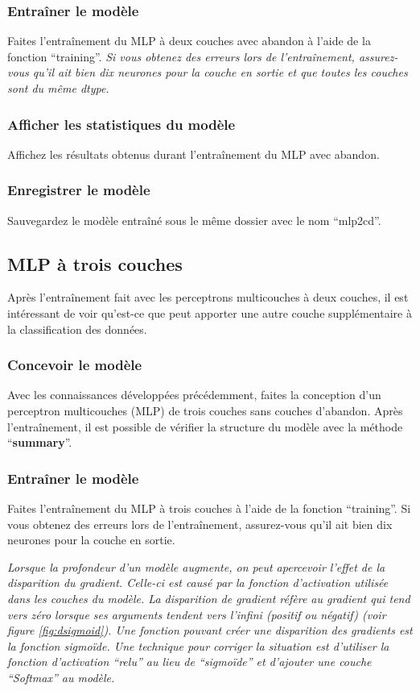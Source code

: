 \documentclass{article}
\begin{document}
\subsubsection{Entraîner le modèle}
Faites l'entraînement du MLP à deux couches avec abandon à l'aide de la fonction ``training''.
\medbreak
\textit{Si vous obtenez des erreurs lors de l'entraînement, assurez-vous qu'il ait bien dix neurones pour la couche en sortie et que toutes les couches sont du même dtype.}
\subsubsection{Afficher les statistiques du modèle}
Affichez les résultats obtenus durant l'entraînement du MLP avec abandon.
\subsubsection{Enregistrer le modèle}
Sauvegardez le modèle entraîné sous le même dossier avec le nom ``mlp2cd''.

\subsection{MLP à trois couches}
Après l'entraînement fait avec les perceptrons multicouches à deux couches, il est intéressant de voir qu'est-ce que peut apporter une autre couche supplémentaire à la classification des données.
\subsubsection{Concevoir le modèle}
Avec les connaissances développées précédemment, faites la conception d'un perceptron multicouches (MLP) de trois couches sans couches d'abandon. Après l'entraînement, il est possible de vérifier la structure du modèle avec la méthode ``\textbf{summary}''.

\subsubsection{Entraîner le modèle}
Faites l'entraînement du MLP à trois couches à l'aide de la fonction ``training''.
\medbreak
Si vous obtenez des erreurs lors de l'entraînement, assurez-vous qu'il ait bien dix neurones pour la couche en sortie.
\medbreak

\textit{Lorsque la profondeur d'un modèle augmente, on peut apercevoir l'effet de la disparition du gradient. Celle-ci est causé par la fonction d'activation utilisée dans les couches du modèle. La disparition de gradient réfère au gradient qui tend vers zéro lorsque ses arguments tendent vers l'infini (positif ou négatif) (voir figure \ref{fig:dsigmoid}). Une fonction pouvant créer une disparition des gradients est la fonction sigmoïde. Une technique pour corriger la situation est d'utiliser la fonction d'activation ``relu'' au lieu de ``sigmoïde'' et d'ajouter une couche ``Softmax'' au modèle.}
\end{document}
